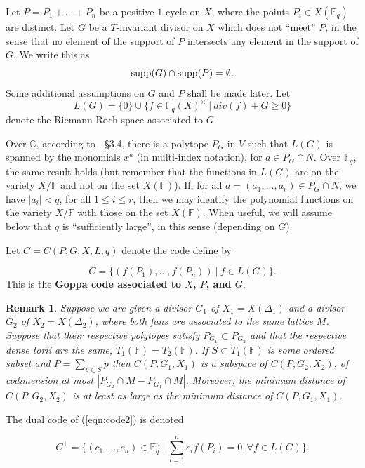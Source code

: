 \documentclass[12pt]{article}
\newtheorem{remark}[theorem]{Remark}
\def\fff{\mathbb{F}}
\def\ccc{\mathbb{C}}
\begin{document}
Let $P=P_1+...+P_n$ be a positive $1$-cycle on $X$,
where the points $P_i\in X(\fff_q)$ are distinct.
Let $G$ be a $T$-invariant divisor on $X$ which does not ``meet'' $P$,
in the sense that no element of the support of $P$ 
intersects any element in the support of $G$. We
write this as
\[
{\rm supp}(G)\cap {\rm supp}(P)=\emptyset.
\]
Some additional assumptions on $G$ and $P$ shall be made later.
Let 
\[
L(G)=\{0\}\cup \{f\in \fff_q(X)^\times \ |\ div(f)+G\geq 0\}
\]
denote the Riemann-Roch space associated to $G$.

Over $\ccc$, according to \cite{F}, \S 3.4, there is a polytope 
$P_G$ in $V$ such that $L(G)$ is spanned by the
monomials $x^a$ (in multi-index notation), for $a\in P_G\cap N$.
Over $\fff_q$, the same result holds (but remember 
that the functions in $L(G)$ are on the variety $X/\overline{\fff}$ and not on the 
set $X(\fff)$). If,
for all $a=(a_1,...,a_r)\in P_G\cap N$, we have 
$|a_i|<q$, for all $1\leq i\leq r$, then we may 
identify the polynomial functions on the variety $X/\fff$ with those on the 
set $X(\fff)$. When useful, we will assume below that $q$
is ``sufficiently large'', in this sense (depending on $G$).

Let $C=C(P,G,X,L,q)$ denote the code define by

\begin{equation}
\label{eqn:code2}
C=\{(f(P_1),...,f(P_n))\ |\ f\in L(G)\}.
\end{equation}
This is the {\bf Goppa code associated to $X$, $P$,
and $G$}. 

\begin{remark}
\label{remark:subcode}
Suppose we are given a divisor $G_1$ of $X_1=X(\Delta_1)$ and
a divisor $G_2$ of $X_2=X(\Delta_2)$, where both fans
are associated to the same lattice $M$. Suppose that
their respective polytopes satisfy $P_{G_1}\subset P_{G_2}$
and that the respective dense torii are the same,
$T_1(\fff)=T_2(\fff)$. If $S\subset T_1(\fff)$ is some 
ordered subset and $P=\sum_{p\in S}p$ then
$C(P,G_1,X_1)$ is a subspace of $C(P,G_2,X_2)$, of codimension
at most $|P_{G_2}\cap M - P_{G_1}\cap M|$.
Moreover, the minimum distance of $C(P,G_2,X_2)$
is at least as large as the minimum distance of
$C(P,G_1,X_1)$. 
\end{remark}

The dual code of (\ref{eqn:code2}) is denoted

\begin{equation}
\label{eqn:dualcode}
C^\perp = \{(c_1,...,c_n)\in \fff_q^n\ |\ \sum_{i=1}^n c_if(P_i)=0,
\forall f\in L(G)\}.
\end{equation}
\end{document}
